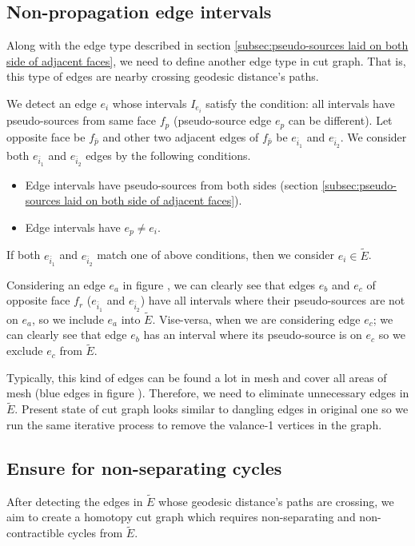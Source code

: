 \documentclass[a4paper,twoside]{article}
\begin{document}
\subsection{Non-propagation edge intervals}
\label{subsec:intervals fail to propagate}
Along with the edge type described in section \ref{subsec:pseudo-sources laid on both side of adjacent faces},  we need to define another edge type in cut graph. That is, this type of edges are nearby crossing geodesic distance's paths.

We detect an edge $e_i$ whose intervals $I_{e_i}$ satisfy the condition: all intervals have pseudo-sources from same face $f_p$ (pseudo-source edge $e_p$ can be different). Let opposite face be $f_{\bar{p}}$ and other two adjacent edges of $f_{\bar{p}}$ be $e_{\bar{i}_1}$ and $e_{\bar{i}_2}$. We consider both $e_{\bar{i}_1}$ and $e_{\bar{i}_2}$ edges by the following conditions.
\begin{itemize}[noitemsep,topsep=10pt]
	  \setlength{\itemsep}{5pt}%
	  \setlength{\parskip}{0cm}%
	\item Edge intervals have pseudo-sources from both sides (section \ref{subsec:pseudo-sources laid on both side of adjacent faces}).
	\item Edge intervals have $e_p \neq e_i$.
\end{itemize}

If both $e_{\bar{i}_1}$ and $e_{\bar{i}_2}$ match one of above conditions, then we consider $e_i \in \tilde{E}$. 

Considering an edge $e_a$ in figure , we can clearly see that edges $e_b$ and $e_c$ of opposite face $f_r$ ($e_{\bar{i}_1}$ and $e_{\bar{i}_2}$) have all intervals where their pseudo-sources are not on $e_a$, so we include $e_a$ into $\tilde{E}$. Vise-versa, when we are considering edge $e_c$; we can clearly see that edge $e_b$ has an interval where its pseudo-source is on $e_c$ so we exclude $e_c$ from $\tilde{E}$.

Typically, this kind of edges can be found a lot in mesh and cover all areas of mesh (blue edges in figure ). Therefore, we need to eliminate unnecessary edges in $\tilde{E}$. Present state of cut graph looks similar to dangling edges in original one so we run the same iterative process to remove the valance-1 vertices in the graph. 



\subsection{Ensure for non-separating cycles}
\label{subsec:ensure non-trivia}
After detecting the edges in $\tilde{E}$ whose geodesic distance's paths are crossing, we aim to create a homotopy cut graph which requires non-separating and non-contractible cycles from $\tilde{E}$.
\end{document}
